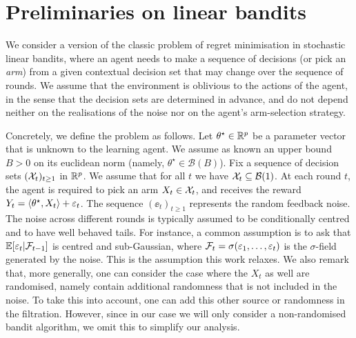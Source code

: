 



\section{Preliminaries on linear bandits}
\label{subsec:LSB}
We consider a version of the classic problem of regret minimisation in stochastic linear bandits, where an agent needs to 
make a sequence of decisions (or pick an \emph{arm}) from a given contextual decision set that may change over the 
sequence of rounds. We assume that the environment is oblivious to the actions of the 
agent, in the sense that the decision sets are determined in advance, and do not depend neither on the realisations of 
the noise nor on the agent's arm-selection strategy. 

Concretely, we define the problem as follows. Let $\theta^\star\in\mathbb{R}^p$ be a parameter vector that is unknown to the 
learning agent. We assume as known an upper bound $B>0$ on its euclidean norm (namely, $\theta^\star\in\mathcal B(B)$). Fix 
a sequence of decision sets $(\mathcal{X}_t)_{t\geq 1}$ in $\mathbb{R}^p$. We assume that for all $t$ we have $\mathcal{X}_t\subseteq\mathcal B(1)$.  At each round $t$, the agent is required to pick an arm 
$X_t\in\mathcal{X}_t$, and receives the reward $Y_t = \langle\theta^\star,X_t\rangle + \varepsilon_t$. The sequence $(\ee_t)_{t\geq1}$ 
represents the random feedback noise. The noise across different rounds is typically assumed to be conditionally centred 
and to have well behaved tails. For instance, a common assumption is to ask that $\mathbb{E}[\varepsilon_t|\mathcal{F}_{t-1}]$ %
is centred and 
sub-Gaussian, where $\mathcal{F}_{t} = \sigma(\varepsilon_1,\dots, \varepsilon_t)$ is the $\sigma$-field generated by the noise. This is the assumption this work relaxes. We also remark that, more generally, one can consider the case where the $X_t$ as well are randomised, namely contain additional randomness that is not included in the noise. To take this into account, one can add this other source or randomness in the filtration. However, since in our case we will only consider a non-randomised bandit algorithm, we omit this to simplify our analysis. 



